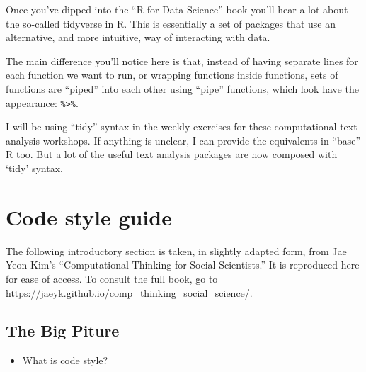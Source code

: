 \documentclass[
  letterpaper,
  DIV=11,
  numbers=noendperiod]{scrreprt}
\providecommand{\tightlist}{%
  \setlength{\itemsep}{0pt}\setlength{\parskip}{0pt}}\usepackage{longtable,booktabs,array}
\begin{document}
Once you've dipped into the ``R for Data Science'' book you'll hear a
lot about the so-called tidyverse in R. This is essentially a set of
packages that use an alternative, and more intuitive, way of interacting
with data.

The main difference you'll notice here is that, instead of having
separate lines for each function we want to run, or wrapping functions
inside functions, sets of functions are ``piped'' into each other using
``pipe'' functions, which look have the appearance:
\texttt{\%\textgreater{}\%}.

I will be using ``tidy'' syntax in the weekly exercises for these
computational text analysis workshops. If anything is unclear, I can
provide the equivalents in ``base'' R too. But a lot of the useful text
analysis packages are now composed with `tidy' syntax.


\hypertarget{code-style-guide}{%
\chapter*{Code style guide}\label{code-style-guide}}

\begin{tcolorbox}[enhanced jigsaw, rightrule=.15mm, arc=.35mm, bottomrule=.15mm, colback=white, toprule=.15mm, breakable, left=2mm, colframe=quarto-callout-note-color-frame, leftrule=.75mm, opacityback=0]
\begin{minipage}[t]{5.5mm}
\textcolor{quarto-callout-note-color}{\faInfo}
\end{minipage}%
\begin{minipage}[t]{\textwidth - 5.5mm}
The following introductory section is taken, in slightly adapted form,
from Jae Yeon Kim's ``Computational Thinking for Social Scientists.'' It
is reproduced here for ease of access. To consult the full book, go to
\url{https://jaeyk.github.io/comp_thinking_social_science/}.\end{minipage}%
\end{tcolorbox}

\hypertarget{the-big-piture}{%
\section*{The Big Piture}\label{the-big-piture}}

\begin{itemize}
\tightlist
\item
  What is code style?
\end{itemize}
\end{document}
